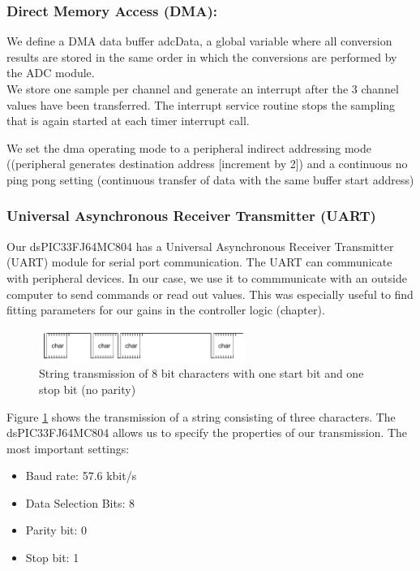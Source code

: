 \subsubsection*{Direct Memory Access (DMA):}

We define a DMA data buffer adcData, a global variable where all conversion results are stored in the same order in which the conversions are performed by the ADC module.\\
We store one sample per channel and generate an interrupt after the 3 channel values have been transferred. The interrupt service routine stops the sampling that is again started at each timer interrupt call. 

We set the dma operating mode to a peripheral indirect addressing mode ((peripheral generates destination address [increment by 2]) and a continuous no ping pong setting (continuous transfer of data with the same buffer start address)

\subsubsection*{Universal Asynchronous Receiver Transmitter (UART)}
Our dsPIC33FJ64MC804 has a Universal Asynchronous Receiver Transmitter (UART)  module for serial port communication.
The UART can communicate with peripheral devices. 
In our case, we use it to commmunicate with an outside computer to send commands or read out values. This was especially useful to find fitting parameters for our gains in the controller logic (chapter).

\begin{figure}[htb]
    \centering
    \includegraphics[width=0.6\textwidth]{figures/software/uart_demo.png}
    \caption {String transmission of 8 bit characters with one start bit and one stop bit (no parity) \cite{alex}}
    \label{fig:uart_demo}
\end{figure}

Figure \ref{fig:uart_demo} shows the transmission of a string consisting of three characters. 
The dsPIC33FJ64MC804 allows us to specify the properties of our transmission. The most important settings:
\begin{itemize}
    \item Baud rate: 57.6 kbit/s
    \item Data Selection Bits: 8
    \item Parity bit: 0
    \item Stop bit: 1
\end{itemize}


